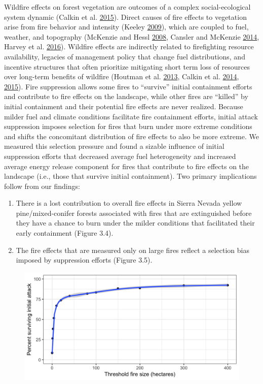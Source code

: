 \documentclass[twoside,12pt,final]{ucthesis-CA2012}
\begin{document}
\begin{ucmainmatter}
Wildfire effects on forest vegetation are outcomes of a complex
social-ecological system dynamic (Calkin et al.
\protect\hyperlink{ref-calkin2015}{2015}). Direct causes of fire effects
to vegetation arise from fire behavior and intensity (Keeley
\protect\hyperlink{ref-keeley2009}{2009}), which are coupled to fuel,
weather, and topography (McKenzie and Hessl
\protect\hyperlink{ref-mckenzie2008}{2008}, Cansler and McKenzie
\protect\hyperlink{ref-cansler2014}{2014}, Harvey et al.
\protect\hyperlink{ref-harvey2016b}{2016}). Wildfire effects are
indirectly related to firefighting resource availability, legacies of
management policy that change fuel distributions, and incentive
structures that often prioritize mitigating short term loss of resources
over long-term benefits of wildfire (Houtman et al.
\protect\hyperlink{ref-houtman2013}{2013}, Calkin et al.
\protect\hyperlink{ref-calkin2014}{2014},
\protect\hyperlink{ref-calkin2015}{2015}). Fire suppression allows some
fires to ``survive'' initial containment efforts and contribute to fire
effects on the landscape, while other fires are ``killed'' by initial
containment and their potential fire effects are never realized. Because
milder fuel and climate conditions facilitate fire containment efforts,
initial attack suppression imposes selection for fires that burn under
more extreme conditions and shifts the concomitant distribution of fire
effects to also be more extreme. We measured this selection pressure and
found a sizable influence of initial suppression efforts that decreased
average fuel heterogeneity and increased average energy release
component for fires that contribute to fire effects on the landscape
(i.e., those that survive initial containment). Two primary implications
follow from our findings:
\begin{enumerate}
\def\labelenumi{\arabic{enumi})}
\item
  There is a lost contribution to overall fire effects in Sierra Nevada
  yellow pine/mixed-conifer forests associated with fires that are
  extinguished before they have a chance to burn under the milder
  conditions that facilitated their early containment (Figure 3.4).
\item
  The fire effects that are measured only on large fires reflect a
  selection bias imposed by suppression efforts (Figure 3.5).
\end{enumerate}
\begin{figure}
\centering
\includegraphics[width=6.00000in]{figure/chap03/prop-surviving-ia-by-size_short.png}

\end{figure}
\end{ucmainmatter}
\end{document}
